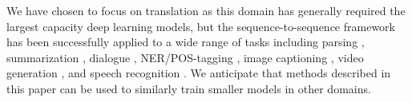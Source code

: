 \documentclass[11pt,letterpaper]{article}
\begin{document}
We have chosen to focus on translation as this domain has generally required the largest
capacity deep learning models, but the sequence-to-sequence framework has been successfully applied
to a wide range of tasks including parsing \cite{Vinyals2015}, summarization \cite{Rush2015}, 
dialogue \cite{Vinyals2015c,Serban2016,Li2016}, NER/POS-tagging \cite{Gillick2016},
image captioning \cite{Vinyals2015b,Xu2015}, video generation \cite{Srivastava2015a},
and speech recognition \cite{Chan2015}.
We anticipate that methods described in this paper can be used to similarly train smaller
models in other domains. 



\end{document}
